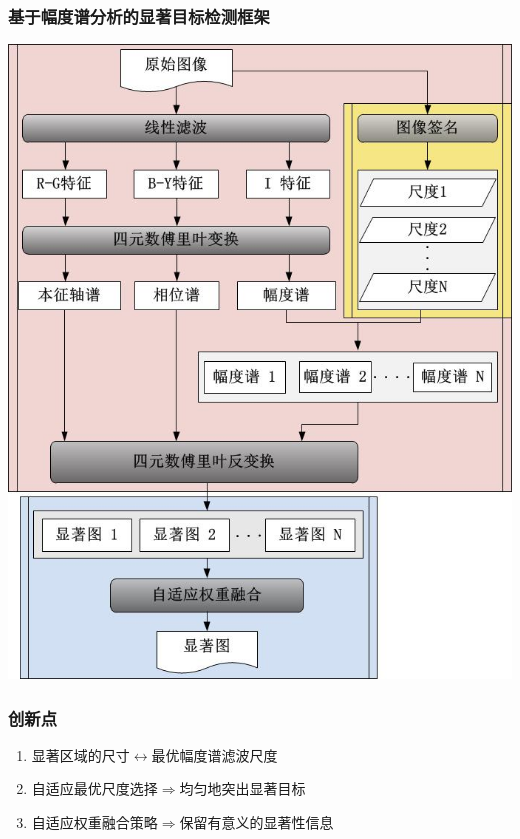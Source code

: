 \documentclass[notheorems,mathserif,table,compress]{beamer}  %
\begin{document}
\begin{frame}
  \frametitle{基于幅度谱分析的显著目标检测框架}
\begin{center}
\includegraphics[width=0.42\linewidth]{frame1.jpg}%
\end{center}
\end{frame}

\begin{frame}
  \frametitle{创新点}
  \begin{enumerate}
  \item 显著区域的尺寸$\longleftrightarrow$最优幅度谱滤波尺度
  \item 自适应最优尺度选择$\Longrightarrow$均匀地突出显著目标
  \item 自适应权重融合策略$\Longrightarrow$保留有意义的显著性信息
  \end{enumerate}
\end{frame}
\end{document}
